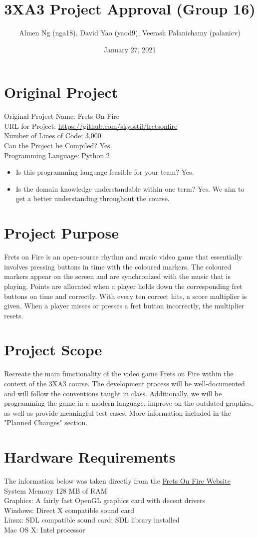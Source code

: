 \documentclass{article}
\title{3XA3 Project Approval (Group 16)}
\author{Almen Ng (nga18), David Yao (yaod9), Veerash Palanichamy (palanicv)}
\date{January 27, 2021}
\begin{document}
\maketitle

\section{Original Project}
Original Project Name: Frets On Fire\\
URL for Project: \url{https://github.com/skyostil/fretsonfire} \\
Number of Lines of Code: 3,000\\
Can the Project be Compiled? Yes.\\
Programming Language: Python 2
\begin{itemize}
    \item Is this programming language feasible for your team? Yes.
    \item Is the domain knowledge understandable within one term? Yes. We aim to get a better understanding throughout the course. 
\end{itemize}

\section{Project Purpose}
Frets on Fire is an open-source rhythm and music video game that essentially involves pressing buttons in time with the coloured markers. The coloured markers appear on the screen and are synchronized with the music that is playing. Points are allocated when a player holds down the corresponding fret buttons on time and correctly. With every ten correct hits, a score multiplier is given. When a player misses or presses a fret button incorrectly, the multiplier resets.

\section{Project Scope}
Recreate the main functionality of the video game Frets on Fire within the context of the 3XA3 course.
The development process will be well-documented and will follow the conventions taught in class. Additionally, we will be programming the game in a modern language, improve on the outdated graphics, as well as provide meaningful test cases. More information included in the "Planned Changes" section.

\section{Hardware Requirements}
The information below was taken directly from the \href{http://fretsonfire.sourceforge.net/about/}{Frets On Fire Website} \\
System Memory 128 MB of RAM \\
Graphics: A fairly fast OpenGL graphics card with decent drivers \\
Windows: Direct X compatible sound card \\ 
Linux: SDL compatible sound card; SDL library installed \\
Mac OS X: Intel processor
\end{document}
